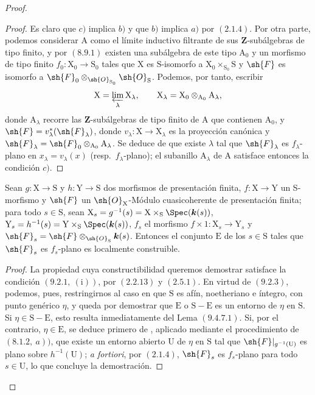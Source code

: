 \begin{proof}
\begin{proof}
Es claro que $c)$ implica $b)$ y que $b)$ implica $a)$ por
$(2.1.4)$. Por otra parte, podemos considerar $\mathrm{A}$ como el límite
inductivo filtrante de sus $\mathbf{Z}$-subálgebras de tipo finito, y por $(8.9.1)$
existen una subálgebra de este tipo $\mathrm{A}_0$ y un morfismo de tipo finito
$f_0:\mathrm{X}_0\to\mathrm{S}_0$ tales que $\mathrm{X}$ es
$\mathrm{S}$-isomorfo a
$\mathrm{X}_0\times_{\mathrm{S}_0}\mathrm{S}$ y $\sh{F}$ es isomorfo
a $\sh{F}_0\otimes_{\sh{O}_{\mathrm{S}_0}}\sh{O}_{\mathrm{S}}$. Podemos,
por tanto, escribir
\[
  \mathrm{X}=\varprojlim_\lambda \mathrm{X}_\lambda,\qquad
  \mathrm{X}_\lambda=\mathrm{X}_0\otimes_{\mathrm{A}_0}\mathrm{A}_\lambda,
\]
donde $\mathrm{A}_\lambda$ recorre las
$\mathbf{Z}$-subálgebras de tipo finito de $\mathrm{A}$ que contienen $\mathrm{A}_0$, y
$\sh{F}=v_\lambda^*(\sh{F}_\lambda)$, donde
$v_\lambda:\mathrm{X}\to\mathrm{X}_\lambda$ es la proyección canónica y
$\sh{F}_\lambda=\sh{F}_0\otimes_{\mathrm{A}_0}\mathrm{A}_\lambda$. Se
deduce de  que existe $\lambda$ tal que
$\sh{F}_\lambda$ es $f_\lambda$-plano en
$x_\lambda=v_\lambda(x)$ (resp.\ $f_\lambda$-plano); el subanillo
$\mathrm{A}_\lambda$ de $\mathrm{A}$ satisface entonces la condición $c)$.
\end{proof}

\begin{proposition}[11.2.8]
\label{IV.11.2.8}
Sean $g:\mathrm{X}\to\mathrm{S}$ y $h:\mathrm{Y}\to\mathrm{S}$ dos morfismos de presentación finita, $f:\mathrm{X}\to\mathrm{Y}$ un S-morfismo y $\sh{F}$ un $\sh{O}_\mathrm{X}$-Módulo cuasicoherente de presentación finita; para todo $s\in\mathrm{S}$, sean $\mathrm{X}_s=g^{-1}(s)=\mathrm{X}\times_\mathrm{S}\Spec(\boldsymbol{k}(s))$, $\mathrm{Y}_s=h^{-1}(s)=\mathrm{Y}\times_\mathrm{S}\Spec(\boldsymbol{k}(s))$, $f_s$ el morfismo $f\times 1:\mathrm{X}_s\to\mathrm{Y}_s$ y $\sh{F}_s=\sh{F}\otimes_{\sh{O}_\mathrm{S}}\boldsymbol{k}(s)$. Entonces el conjunto $\mathrm{E}$ de los $s\in\mathrm{S}$ tales que $\sh{F}_s$ es $f_s$-plano es localmente construible.
\end{proposition}

\begin{proof}
La propiedad cuya constructibilidad queremos demostrar satisface la condición
$(9.2.1,~(\mathrm{i}))$, por $(2.2.13)$ y $(2.5.1)$. En virtud de
$(9.2.3)$, podemos, pues, restringirnos al caso en que $\mathrm{S}$ es
afín, noetheriano e íntegro, con punto genérico $\eta$, y queda por
demostrar que $\mathrm{E}$ o $\mathrm{S}-\mathrm{E}$ es un entorno
de $\eta$ en $\mathrm{S}$. Si
$\eta\in\mathrm{S}-\mathrm{E}$, esto resulta inmediatamente del Lema
$(9.4.7.1)$. Si, por el contrario, $\eta\in\mathrm{E}$, se deduce primero
de , aplicado mediante el procedimiento de $(8.1.2,~a))$, que existe
un entorno abierto $\mathrm{U}$ de $\eta$ en $\mathrm{S}$ tal que
$\sh{F}|_{g^{-1}(\mathrm{U})}$ es plano sobre $h^{-1}(\mathrm{U})$; \emph{a
fortiori}, por $(2.1.4)$, $\sh{F}_s$ es $f_s$-plano para todo
$s\in\mathrm{U}$, lo que concluye la demostración.
\end{proof}


\end{proof}
